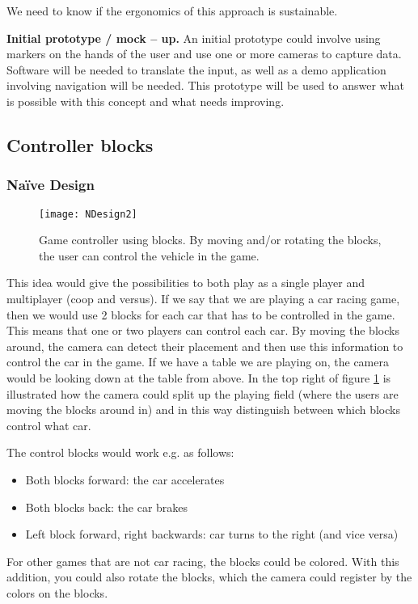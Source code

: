 We need to know if the ergonomics of this approach is sustainable.
\bigskip

\noindent\textbf{Initial prototype / mock – up.} \newline
An initial prototype could involve using markers on the hands of the user and use one or more cameras to capture data. Software will be needed to translate the input, as well as a demo application involving navigation will be needed. This prototype will be used to answer what is possible with this concept and what needs improving. 

\pagebreak

\subsection{Controller blocks} \label{nd2}
\subsubsection*{Naïve Design}

\begin{figure}[h]
\centering
\texttt{[image: NDesign2]}
\caption{Game controller using blocks. By moving and/or rotating the blocks, the user can control the vehicle in the game.}
\label{fig:ndesign2}
\end{figure}
This idea would give the possibilities to both play as a single player and multiplayer (coop and versus). If we say that we are playing a car racing game, then we would use 2 blocks for each car that has to be controlled in the game. This means that one or two players can control each car. By moving the blocks around, the camera can detect their placement and then use this information to control the car in the game. If we have a table we are playing on, the camera would be looking down at the table from above. In the top right of figure \ref{fig:ndesign2} is illustrated how the camera could split up the playing field (where the users are moving the blocks around in) and in this way distinguish between which blocks control what car.

The control blocks would work e.g. as follows:
\begin{itemize}
\item Both blocks forward: the car accelerates
\item Both blocks back: the car brakes
\item Left block forward, right backwards: car turns to the right (and vice versa)
\end{itemize}
For other games that are not car racing, the blocks could be colored. With this addition, you could also rotate the blocks, which the camera could register by the colors on the blocks.

